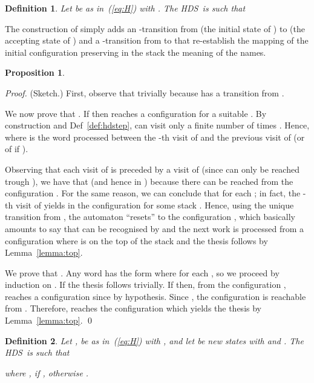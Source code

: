 \documentclass[runningheads,a4paper]{llncs}
\newcommand{\longversion}[1]{#1}
\newcommand{\hdns}{HDS}
\newtheorem{definition}{Theorem}[section]
\newtheorem{proposition}{Theorem}[section]
\newtheorem{definition}{Definition}[section]
\newtheorem{proposition}{Proposition}[section]
\begin{document}
\begin{definition}\label{def:H*}
  Let  be as in~(\ref{eq:H}) with .
The \hdns\  is such that
  
\end{definition}
The construction of  simply adds an
-transition from  (the initial state of )
to  (the accepting state of ) and a
-transition from  to  that re-establish the mapping
of the initial configuration preserving in the stack the meaning of
the names.
\begin{proposition}\label{prop:H*}
    
\end{proposition}
\longversion{
  \begin{proof}(Sketch.)
First, observe that trivially  because  has a
    transition  from .

    We now prove that .
If  then  reaches a configuration 
    for a suitable .
By construction and Def~\ref{def:hdstep}, 
    can visit  only a finite number of times .
Hence,  where  is the word
    processed between the -th visit of  and the previous visit
    of  (or of  if ).
    
    Observing that each visit of  is preceded by a visit of
     (since  can only be reached trough ), we have
    that  (and hence in ) because there  can be reached from the configuration
    .
For the same reason, we can conclude that  for each ; in fact, the
    -th visit of  yields  in the
    configuration 
    for some stack .
Hence, using the unique transition  from
    , the automaton ``resets'' to the configuration
    , which
    basically amounts to say that  can be recognised by  and the next work  is processed from a configuration
    where  is on the top of the stack and the thesis follows
    by Lemma~\ref{lemma:top}.

    We prove that .
Any word  has the form  where  for each , so we proceed  by induction on .
If  the thesis follows trivially.
If  then, from the configuration ,  reaches a
    configuration  since
     by hypothesis.
Since , the
    configuration  is reachable from .
Therefore,  reaches the configuration  which
    yields the thesis by Lemma~\ref{lemma:top}.
\qed
  \end{proof}
}

\begin{definition}\label{def:[n]H}
  Let ,  be as in~(\ref{eq:H}) with , and let  be new states with
   and
  .
The \hdns\  is such that
  
  where , if
  , otherwise .
\end{definition}
\end{document}
